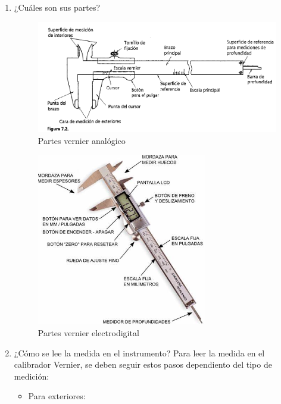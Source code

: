 \documentclass{article}
\theoremstyle{mytheoremstyle}
\theoremstyle{mytheoremstyle}
\theoremstyle{myproblemstyle}
\begin{document}
\begin{enumerate}
	\item ¿Cuáles son sus partes?

	      \begin{figure}[H]
		      \centering
		      \includegraphics[width=1\textwidth]{partes_vernier.png}
		      \caption{Partes vernier analógico}
		      \label{fig:imagen2}
	      \end{figure}
	      \begin{figure}[H]
		      \centering
		      \includegraphics[width=0.7\textwidth]{partes_vernier.jpeg}
		      \caption{Partes vernier electrodigital}
		      \label{fig:imagen2}
	      \end{figure}
	\item ¿Cómo se lee la medida en el instrumento?\newline
	      Para leer la medida en el calibrador Vernier, se deben seguir estos pasos dependiento del tipo de medición:
	      \begin{itemize}
		      \item Para exteriores:
		            \begin{itemize}

\end{itemize}
\end{itemize}
\end{enumerate}
\end{document}

